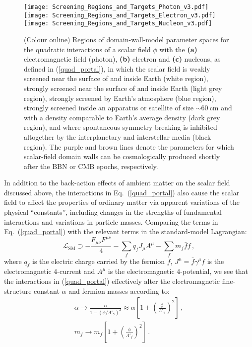 \documentclass[aps,prd,onecolumn,nofootinbib]{revtex4-2} %
\begin{document}
\begin{figure*}[t!]
\centering
\texttt{[image: Screening\_Regions\_and\_Targets\_Photon\_v3.pdf]}
\hspace{5mm}
\vspace{3mm}
\texttt{[image: Screening\_Regions\_and\_Targets\_Electron\_v3.pdf]}
\texttt{[image: Screening\_Regions\_and\_Targets\_Nucleon\_v3.pdf]}
\caption{ \normalsize (Colour online) 
Regions of domain-wall-model parameter spaces for the quadratic interactions of a scalar field $\phi$ with the \textbf{(a)} electromagnetic field (photon), \textbf{(b)} electron and \textbf{(c)} nucleons, as defined in (\ref{quad_portal}), 
in which the scalar field is weakly screened near the surface of and inside Earth (white region), 
strongly screened near the surface of and inside Earth (light grey region), 
strongly screened by Earth's atmosphere (blue region), 
strongly screened inside an apparatus or satellite of size $\sim 60~\textrm{cm}$ and with a density comparable to Earth's average density (dark grey region), 
and where spontaneous symmetry breaking is inhibited altogether by the interplanetary and interstellar media (black region). 
The purple and brown lines denote the parameters for which scalar-field domain walls can be cosmologically produced shortly after the BBN or CMB epochs, respectively. 
}
\label{Fig:Screening_regions}
\end{figure*}



In addition to the back-action effects of ambient matter on the scalar field discussed above, the interactions in Eq.~(\ref{quad_portal}) also cause the scalar field to affect the properties of ordinary matter via apparent variations of the physical ``constants'', including changes in the strengths of fundamental interactions and variations in particle masses. 
Comparing the terms in Eq.~(\ref{quad_portal}) with the relevant terms in the standard-model Lagrangian: 
\begin{equation}
\label{SM_Lagrangian}
\mathcal{L}_\textrm{SM} \supset - \frac{F_{\mu\nu}F^{\mu\nu}}{4} - \sum_f  q_f J_\mu A^\mu - \sum_f  m_f \bar{f}f  \, ,
\end{equation}
where $q_f$ is the electric charge carried by the fermion $f$, $J^\mu = \bar{f} \gamma^\mu f$ is the electromagnetic 4-current and $A^\mu$ is the electromagnetic 4-potential, 
we see that the interactions in (\ref{quad_portal}) effectively alter the electromagnetic fine-structure constant $\alpha$ and fermion masses according to: 
\begin{gather}
\alpha \to \frac{\alpha}{1 - \left(\phi/\Lambda'_\gamma\right)^2} \approx \alpha \left[ 1 + \left(\frac{\phi}{\Lambda'_\gamma}\right)^2 \right]  \, ,  \label{quad_VFCs-alpha} \\ 
m_f \to m_f \left[1 + \left(\frac{\phi}{\Lambda'_f}\right)^2 \right] \, . \label{quad_VFCs-fermions} 
\end{gather}
\end{document}
